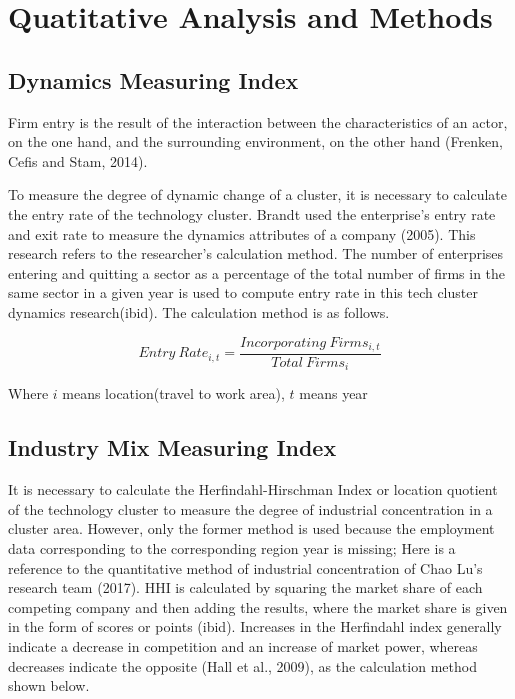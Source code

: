 \documentclass[
  12pt,
  oneside]{book}
\begin{document}
\hypertarget{quatitative-analysis-and-methods}{%
\section{Quatitative Analysis and Methods}\label{quatitative-analysis-and-methods}}

\hypertarget{dynamics-measuring-index}{%
\subsection{Dynamics Measuring Index}\label{dynamics-measuring-index}}

Firm entry is the result of the interaction between the
characteristics of an actor, on the one hand, and the surrounding environment, on the other hand (Frenken, Cefis and Stam, 2014).

To measure the degree of dynamic change of a cluster, it is necessary to calculate the entry rate of the technology cluster. Brandt used the enterprise's entry rate and exit rate to measure the dynamics attributes of a company (2005). This research refers to the researcher's calculation method. The number of enterprises entering and quitting a sector as a percentage of the total number of firms in the same sector in a given year is used to compute entry rate in this tech cluster dynamics research(ibid). The calculation method is as follows.

\[ 
Entry\ Rate_{i,t} = \frac{Incorporating\ Firms_{i,t}}{Total\  Firms_{i}} 
\]

Where \(i\) means location(travel to work area), \(t\) means year

\hypertarget{industry-mix-measuring-index}{%
\subsection{Industry Mix Measuring Index}\label{industry-mix-measuring-index}}

It is necessary to calculate the Herfindahl-Hirschman Index or location quotient of the technology cluster to measure the degree of industrial concentration in a cluster area. However, only the former method is used because the employment data corresponding to the corresponding region year is missing; Here is a reference to the quantitative method of industrial concentration of Chao Lu's research team (2017). HHI is calculated by squaring the market share of each competing company and then adding the results, where the market share is given in the form of scores or points (ibid). Increases in the Herfindahl index generally indicate a decrease in competition and an increase of market power, whereas decreases indicate the opposite (Hall et al., 2009), as the calculation method shown below.
\end{document}
